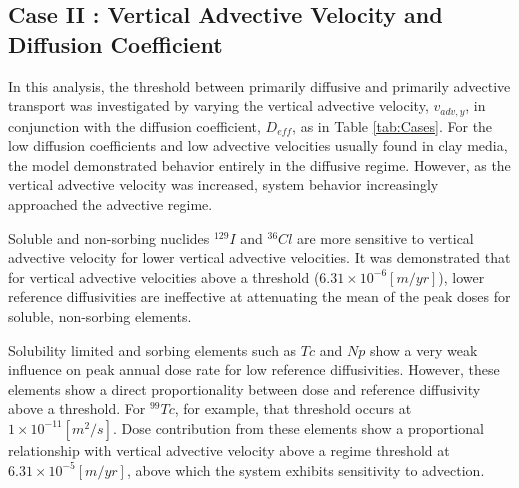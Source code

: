 \subsection{Case II : Vertical Advective Velocity and Diffusion Coefficient}

In this analysis, the threshold between primarily diffusive and primarily 
advective transport was investigated by varying the vertical advective velocity, 
$v_{adv,y}$, in conjunction with the diffusion coefficient, $D_{eff}$, as in 
Table \ref{tab:Cases}.
For the low diffusion coefficients and low advective 
velocities usually found in clay media, the model demonstrated behavior entirely 
in the diffusive regime. However, as the vertical advective velocity was 
increased, system behavior increasingly approached the advective regime. 

Soluble and non-sorbing nuclides $^{129}I$ and 
$^{36}Cl$ are more sensitive to vertical advective velocity for lower vertical 
advective velocities. It was demonstrated that for vertical advective velocities 
above a threshold ($6.31\times10^{-6}[m/yr]$), lower reference diffusivities are 
ineffective at attenuating the mean of the peak doses for soluble, non-sorbing 
elements. 

Solubility limited and sorbing elements such as $Tc$ and $Np$ show a very weak 
influence on peak annual dose rate for low reference diffusivities. However, 
these elements show a direct proportionality between dose and reference 
diffusivity above a threshold.  For $^{99}Tc$, for example, that threshold 
occurs at $1\times10^{-11}[m^2/s]$.  Dose contribution from these elements show 
a proportional relationship with vertical advective velocity above a regime 
threshold at $6.31\times10^{-5}[m/yr]$, above which the system exhibits 
sensitivity to advection. 


